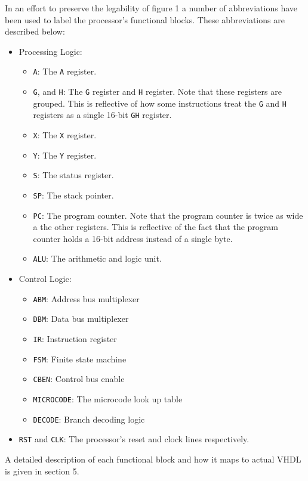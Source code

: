 \documentclass[a4paper,12pt]{article}
\newcommand{\Ar}{\texttt{A}}
\newcommand{\Gr}{\texttt{G}}
\newcommand{\Hr}{\texttt{H}}
\newcommand{\Xr}{\texttt{X}}
\newcommand{\Yr}{\texttt{Y}}
\newcommand{\Sr}{\texttt{S}}
\newcommand{\SP}{\texttt{SP}}
\newcommand{\PC}{\texttt{PC}}
\begin{document}
In an effort to preserve the legability of figure 1 a number of abbreviations
have been used to label the processor's functional blocks. These abbreviations
are described below:
\begin{itemize}
	\item Processing Logic:
	\begin{itemize}
		\item \Ar{}: The \Ar{} register.
		\item \Gr{}, and \Hr{}: The \Gr{} register and \Hr{} register. 
		Note that these registers are grouped. This is reflective of how
		some instructions treat the \Gr{} and \Hr{} registers as a 
		single 16-bit \Gr{}\Hr{} register.
		\item \Xr{}: The \Xr{} register.
		\item \Yr{}: The \Yr{} register.
		\item \Sr{}: The status register.
		\item \SP{}: The stack pointer.
		\item \PC{}: The program counter. Note that the program counter
		is twice as wide a the other registers. This is reflective of 
		the fact that the program counter holds a 16-bit address instead
		of a single byte.
		\item \texttt{ALU}: The arithmetic and logic unit.
	\end{itemize}
	\item Control Logic:
	\begin{itemize}
		\item \texttt{ABM}: Address bus multiplexer
		\item \texttt{DBM}: Data bus multiplexer
		\item \texttt{IR}: Instruction register
		\item \texttt{FSM}: Finite state machine
		\item \texttt{CBEN}: Control bus enable
		\item \texttt{MICROCODE}: The microcode look up table
		\item \texttt{DECODE}: Branch decoding logic
	\end{itemize}
	\item \texttt{RST} and \texttt{CLK}: The processor's reset and clock 
	lines respectively.
\end{itemize}
A detailed description of each functional block and how it maps to actual VHDL 
is given in section 5.
\par
\end{document}
